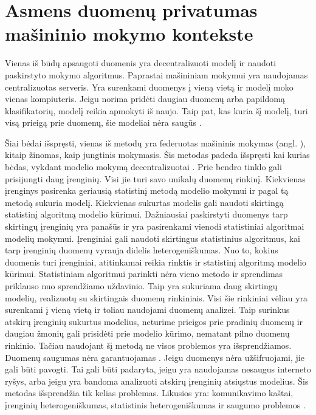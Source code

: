 \documentclass{VUMIFInfBakalaurinis}
\begin{document}
\section{Asmens duomenų privatumas mašininio mokymo kontekste}
	\par Vienas iš būdų apsaugoti duomenis yra decentralizuoti modelį ir naudoti paskirstyto mokymo algoritmus. Paprastai mašininiam mokymui yra naudojamas centralizuotas serveris. Yra surenkami duomenys į vieną vietą ir modelį moko vienas kompiuteris. Jeigu norima pridėti daugiau duomenų arba papildomą klasifikatorių, modelį reikia apmokyti iš naujo. Taip pat, kas kuria šį modelį, turi visą prieigą prie duomenų, šie modeliai nėra saugūs \cite{13}. 
	\par Šiai bėdai išspręsti, vienas iš metodų yra federuotas mašininis mokymas (angl. ), kitaip žinomas, kaip jungtinis mokymasis. Šis metodas padeda išspręsti kai kurias bėdas, vykdant modelio mokymą decentralizuotai \cite{3}. Prie bendro tinklo gali prisijungti daug įrenginių. Visi jie turi savo unikalų duomenų rinkinį. Kiekvienas įrenginys pasirenka geriausią statistinį metodą modelio mokymui ir pagal tą metodą sukuria modelį. Kiekvienas sukurtas modelis gali naudoti skirtingą statistinį algoritmą modelio kūrimui. Dažniausiai paskirstyti duomenys tarp skirtingų įrenginių yra panašūs ir yra pasirenkami vienodi statistiniai algoritmai modelių mokymui. Įrenginiai gali naudoti skirtingus statistinius algoritmus, kai tarp įrenginių duomenų vyrauja didelis heterogeniškumas. Nuo to, kokius duomenis turi įrenginiai, atitinkamai reikia rinktis ir statistinį algoritmą modelio kūrimui. Statistiniam algoritmui parinkti nėra vieno metodo ir sprendimas priklauso nuo sprendžiamo uždavinio. Taip yra sukuriama daug skirtingų modelių, realizuotų su skirtingais duomenų rinkiniais. Visi šie rinkiniai vėliau yra surenkami į vieną vietą ir toliau naudojami duomenų analizei. Taip surinkus atskirų įrenginių sukurtus modelius, neturime prieigos prie pradinių duomenų ir daugiau žmonių gali prisidėti prie modelio kūrimo, nematant pilno duomenų rinkinio. Tačiau naudojant šį metodą ne visos problemos yra išsprendžiamos. Duomenų saugumas nėra garantuojamas \cite{3}. Jeigu duomenys nėra užšifruojami, jie gali būti pavogti. Tai gali būti padaryta, jeigu yra naudojamas nesaugus interneto ryšys, arba jeigu yra bandoma analizuoti atskirų įrenginių atsiųstus modelius. Šis metodas išsprendžia tik kelias problemas. Likusios yra: komunikavimo kaštai, įrenginių heterogeniškumas, statistinis heterogeniškumas ir saugumo problemos \cite{4}.
\end{document}
